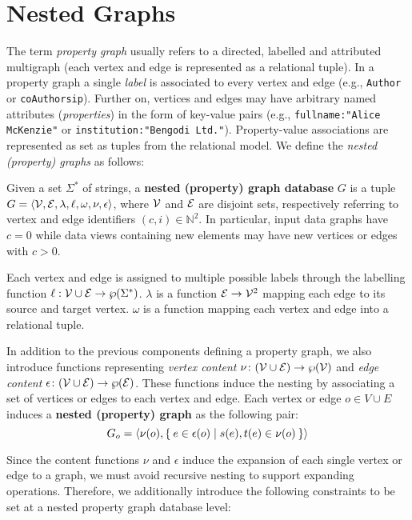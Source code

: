 
\section{Nested Graphs}
\label{sec:model}
The term \textit{property graph}  usually refers to a directed, labelled and attributed multigraph (each vertex and edge is represented as a relational tuple). In a property graph a single \textit{label}  is associated to every vertex and edge (e.g., \texttt{Author} or \texttt{coAuthorsip}). Further on, vertices and edges may have arbitrary named attributes (\textit{properties}) in the form of key-value pairs (e.g., \texttt{fullname:"Alice McKenzie"} or \texttt{institution:"Bengodi Ltd."}). Property-value associations are represented as set as tuples from the relational model. We define the\textit{ nested (property) graphs} as follows:

\begin{definition}
Given a set $\Sigma^*$ of strings,
	a \textbf{nested (property) graph database} $G$ is a tuple $G=\Braket{\mathcal{V}, \mathcal{E}, \lambda,\ell,\omega,\nu,\epsilon}$, where $\mathcal{V}$ and $\mathcal{E}$ are disjoint sets, respectively referring to vertex and edge identifiers $(c,i)\in\mathbb{N}^2$. In particular, input data graphs have $c=0$ while data views containing new elements may have new vertices or edges with $c>0$. 
	
	Each vertex and edge is assigned to multiple possible labels through the labelling function $\ell:\mathcal{V}\cup \mathcal{E}\to \wp(\Sigma^*)$. $\lambda$ is a function $\mathcal{E}\to \mathcal{V}^2$ mapping each edge to its source and target vertex. $\omega$ is a function mapping each vertex and edge into a relational tuple.
	
	In addition to the previous components defining a property graph, we also introduce functions representing \textit{vertex content} $\nu\colon (\mathcal{V}\cup \mathcal{E})\to\wp(\mathcal{V})$ and \textit{edge content} $\epsilon\colon(\mathcal{V}\cup \mathcal{E})\to \wp(\mathcal{E})$. These functions induce the nesting by associating a set of vertices or edges to each vertex and edge. Each vertex or edge $o\in V\cup E$ induces a \textbf{nested (property) graph} as the following pair:
	\[G_o=\Braket{\nu(o),\Set{e\in\epsilon(o)|s(e),t(e)\in\nu(o)}}\]
\end{definition}


Since the content functions $\nu$ and $\epsilon$ induce the expansion of each single vertex or edge to a graph, we must avoid recursive nesting to support expanding operations.
Therefore, we additionally introduce the following constraints to be set at a nested property graph database level:

